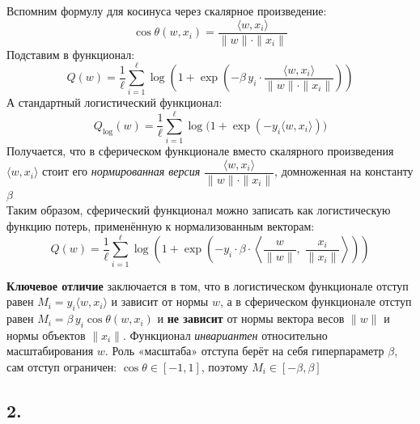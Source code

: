 \documentclass[12pt,a4paper]{article}
\begin{document}
Вспомним формулу для косинуса через скалярное
произведение:
\[
\cos\theta(w, x_i) = \frac{\langle w, x_i\rangle}{\|w\|\cdot\|x_i\|}
\]
Подставим в функционал:
\[
Q(w) = \frac{1}{\ell}\sum_{i=1}^{\ell}
\log\!\left(1 + \exp\!\left(
-\beta\, y_i \cdot \frac{\langle w, x_i\rangle}{\|w\|\cdot\|x_i\|}
\right)\right)
\]
А стандартный логистический функционал:
\[
Q_{\mathrm{log}}(w) = \frac{1}{\ell}\sum_{i=1}^{\ell}
\log\bigl(1 + \exp(-y_i\langle w, x_i\rangle)\bigr)
\]
Получается, что в сферическом функционале вместо скалярного произведения
$\langle w, x_i\rangle$ стоит его \emph{нормированная версия}
$\dfrac{\langle w, x_i\rangle}{\|w\|\cdot\|x_i\|}$, домноженная на
константу $\beta$\\[1mm]
Таким образом, сферический функционал можно записать как логистическую функцию
потерь, применённую к нормализованным векторам:
\[
Q(w) = \frac{1}{\ell}\sum_{i=1}^{\ell}
\log\!\left(1 + \exp\!\left(
-y_i \cdot \beta \cdot \left\langle
\frac{w}{\|w\|},\; \frac{x_i}{\|x_i\|}
\right\rangle
\right)\right)
\]

\textbf{Ключевое отличие} заключается в том, что в логистическом функционале отступ равен $M_i = y_i\langle w, x_i\rangle$ и зависит от нормы $w$, а в сферическом функционале отступ равен $M_i = \beta\, y_i \cos\theta(w, x_i)$ и \textbf{не зависит} от нормы вектора весов $\|w\|$ и нормы объектов $\|x_i\|$. Функционал \emph{инвариантен} относительно масштабирования $w$.
Роль «масштаба» отступа берёт на себя гиперпараметр $\beta$, сам отступ ограничен: $\cos\theta \in [-1,1]$, поэтому $M_i \in [-\beta, \beta]$\\[1mm]

\subsection*{2.}
\end{document}
